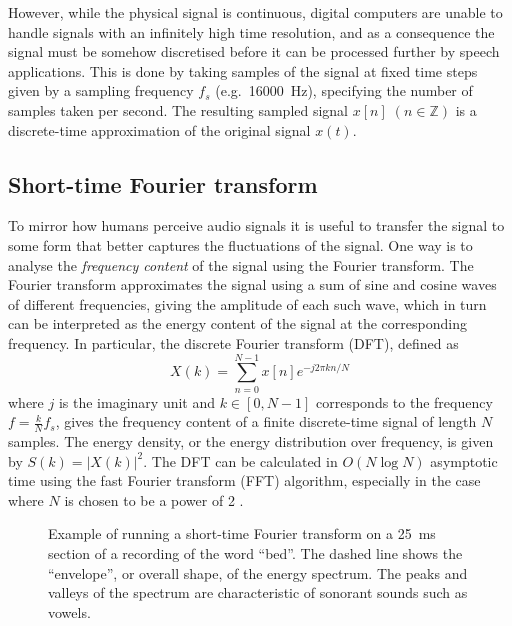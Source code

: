 However, while the physical signal is continuous, digital computers are unable to handle signals with an infinitely high time resolution, and as a consequence the signal must be somehow discretised before it can be processed further by speech applications.
This is done by taking samples of the signal at fixed time steps given by a sampling frequency $f_s$ (e.g.\ \SI{16000}{\Hz}), specifying the number of samples taken per second.
The resulting sampled signal $x[n]\; (n \in \mathbb{Z})$ is a discrete-time approximation of the original signal $x(t)$.

\subsection{Short-time Fourier transform}


To mirror how humans perceive audio signals it is useful to transfer the signal to some form that better captures the fluctuations of the signal.
One way is to analyse the \emph{frequency content} of the signal using the Fourier transform.
The Fourier transform approximates the signal using a sum of sine and cosine waves of different frequencies, giving the amplitude of each such wave, which in turn can be interpreted as the energy content of the signal at the corresponding frequency.
In particular, the discrete Fourier transform (DFT), defined as
\[
X(k) = \sum_{n=0}^{N-1} x[n]e^{-j2\pi kn/N}
\]
where $j$ is the imaginary unit and $k \in [0, N-1]$ corresponds to the frequency $f = \frac{k}{N}f_s$, gives the frequency content of a finite discrete-time signal of length $N$ samples.
The energy density, or the energy distribution over frequency, is given by $S(k) = \left|X(k)\right|^2$.
The DFT can be calculated in $O(N \log N)$ asymptotic time using the fast Fourier transform (FFT) algorithm, especially in the case where $N$ is chosen to be a power of 2 \parencite{cooley1965algorithm}.


\begin{figure}
  \centering
  
  \caption{\label{fig:sftf}Example of running a short-time Fourier transform on a \SI{25}{\ms} section of a recording of the word ``bed''.
  The dashed line shows the ``envelope'', or overall shape, of the energy spectrum.
  The peaks and valleys of the spectrum are characteristic of sonorant sounds such as vowels.}
\end{figure}

